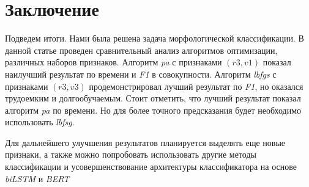 \documentclass{csmathnotes}
\begin{document}
\section*{Заключение}
Подведем итоги. Нами была решена задача морфологической классификации. В данной статье проведен сравнительный анализ алгоритмов оптимизации, различных наборов признаков. Алгоритм \emph{pa} с признаками $(r3, v1)$ показал наилучший результат по времени и \emph{F1}  в совокупности. Алгоритм \emph{lbfgs}  с признаками $(r3, v3)$ продемонстрировал лучший результат по \emph{F1}, но оказался трудоемким и долгообучаемым. Стоит отметить, что лучший результат показал алгоритм \emph{pa} по времени. Но для более точного предсказания будет необходимо использовать \emph{lbfsg}.


Для дальнейшего улучшения результатов планируется выделять еще новые признаки, а также можно попробовать использовать другие методы классификации и усовершенствование архитектуры классификатора на основе \emph{biLSTM} и \emph{BERT}

\printbibliography
\end{document}
